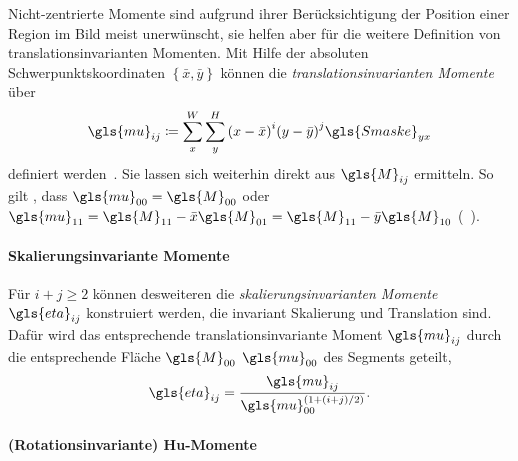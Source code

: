 Nicht-zentrierte Momente sind aufgrund ihrer Berücksichtigung der Position einer Region im Bild meist unerwünscht, sie helfen aber für die weitere Definition von translationsinvarianten Momenten.
Mit Hilfe der absoluten Schwerpunktskoordinaten $\left\{ \bar{x}, \bar{y} \right\}$ können die \emph{translationsinvarianten Momente} über
\begin{equation*}
  \gls{mu}_{ij} \coloneqq \sum_x^W \sum_y^H {\left(x - \bar{x}\right)}^i {\left(y - \bar{y}\right)}^j \gls{Smaske}_{yx}
\end{equation*}
definiert werden~\cite{momente}.
Sie lassen sich weiterhin direkt aus $\gls{M}_{ij}$ ermitteln.
So gilt \zB{}, dass $\gls{mu}_{00} = \gls{M}_{00}$ oder $\gls{mu}_{11} = \gls{M}_{11} - \bar{x}\gls{M}_{01} = \gls{M}_{11} - \bar{y}\gls{M}_{10}$ (\vgl{}~\cite{momente}).

\paragraph{Skalierungsinvariante Momente}
\label{skalierungsinvariante_zentrierte_momente}

Für $i+j \geq 2$ können desweiteren die \emph{skalierungsinvarianten Momente} $\gls{eta}_{ij}$ konstruiert werden, die invariant \bzgl{} Skalierung und Translation sind.
Dafür wird das entsprechende translationsinvariante Moment $\gls{mu}_{ij}$ durch die entsprechende Fläche $\gls{M}_{00}$ \bzw{} $\gls{mu}_{00}$ des Segments geteilt, \dhe{}~\cite{momente}
\begin{equation*}
  \gls{eta}_{ij} = \frac{\gls{mu}_{ij}}{\gls{mu}_{00}^{\left(1+\left(i+j\right)/2\right)}}.
\end{equation*}

\paragraph{(Rotationsinvariante) Hu-Momente}
\label{rotationsinvariante_momente}

